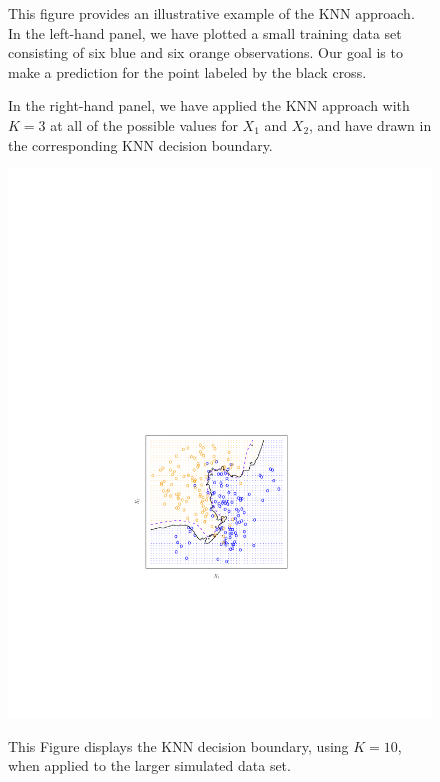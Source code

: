 \documentclass[a4paper]{article}
\newcommand{\highspace}{\vspace{1.2em}\noindent}
\begin{document}
\begin{figure}[!htp]
\begin{examplebox}
            This figure provides an illustrative example of the KNN approach. In the left-hand panel, we have plotted a small training data set consisting of six blue and six orange observations. Our goal is to make a prediction for the point labeled by the black cross.

            \highspace
            In the right-hand panel, we have applied the KNN approach with $K=3$ at all of the possible values for $X_{1}$ and $X_{2}$, and have drawn in the corresponding KNN decision boundary.
        \end{examplebox}
    \end{figure}

    \newpage

    \begin{figure}[!htp]
        \begin{examplebox}
            \begin{center}
                \includegraphics[width=\textwidth]{img/KNN-2.pdf}
                \label{fig: KNN 2}
            \end{center}

            This Figure displays the KNN decision boundary, using $K=10$, when applied to the larger simulated data set.
        \end{examplebox}
    \end{figure}
\end{document}

